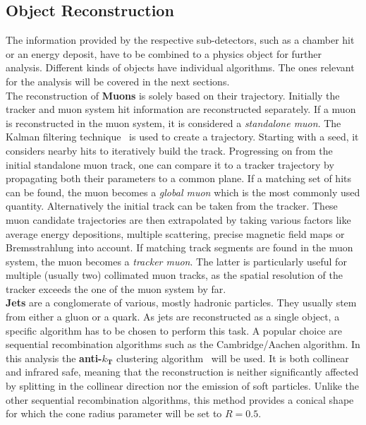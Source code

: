 \subsection{Object Reconstruction}
\label{sec:objreco}

The information provided by the respective sub-detectors, such as a chamber hit or an energy deposit, have to be combined to a physics object for further analysis. Different kinds of objects have individual algorithms. The ones relevant for the analysis will be covered in the next sections. \\

The reconstruction of \textbf{Muons} is solely based on their trajectory. Initially the tracker and muon system hit information are reconstructed separately. If a muon is reconstructed in the muon system, it is considered a \textit{standalone muon}. The Kalman filtering technique~\cite{kalman} is used to create a trajectory. Starting with a seed, it considers nearby hits to iteratively build the track. Progressing on from the initial standalone muon track, one can compare it to a tracker trajectory by propagating both their parameters to a common plane. If a matching set of hits can be found, the muon becomes a \textit{global muon} which is the most commonly used quantity. Alternatively the initial track can be taken from the tracker. These muon candidate trajectories are then extrapolated by taking various factors like average energy depositions, multiple scattering, precise magnetic field maps or Bremsstrahlung into account. If matching track segments are found in the muon system, the muon becomes a \textit{tracker muon}. The latter is particularly useful for multiple (usually two) collimated muon tracks, as the spatial resolution of the tracker exceeds the one of the muon system by far. \\

\textbf{Jets} are a conglomerate of various, mostly hadronic particles. They usually stem from either a gluon or a quark. As jets are reconstructed as a single object, a specific algorithm has to be chosen to perform this task. A popular choice are sequential recombination algorithms such as the Cambridge/Aachen algorithm. In this analysis the \textbf{anti-$k_\textbf{T}$} clustering algorithm~\cite{antikt} will be used. It is both collinear and infrared safe, meaning that the reconstruction is neither significantly affected by splitting in the collinear direction nor the emission of soft particles. Unlike the other sequential recombination algorithms, this method provides a conical shape for which the cone radius parameter will be set to $R = 0.5$.

